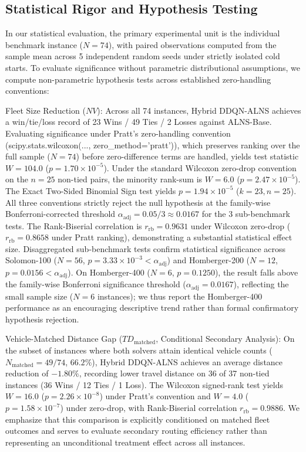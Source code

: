 \documentclass{ieeeaccess}
\begin{document}
\subsection{Statistical Rigor and Hypothesis Testing}
\label{sec:statistical_rigor}

In our statistical evaluation, the primary experimental unit is the individual benchmark instance ($N=74$), with paired observations computed from the sample mean across 5 independent random seeds under strictly isolated cold starts. To evaluate significance without parametric distributional assumptions, we compute non-parametric hypothesis tests across established zero-handling conventions:

Fleet Size Reduction ($NV$): Across all 74 instances, Hybrid DDQN-ALNS achieves a win/tie/loss record of 23 Wins / 49 Ties / 2 Losses against ALNS-Base. Evaluating significance under Pratt's zero-handling convention (\textsf{\small scipy.stats.wilcoxon(..., zero\_method='pratt')}), which preserves ranking over the full sample ($N=74$) before zero-difference terms are handled, yields test statistic $W = 104.0$ ($p = 1.70 \times 10^{-5}$). Under the standard Wilcoxon zero-drop convention on the $n=25$ non-tied pairs, the minority rank-sum is $W = 6.0$ ($p = 2.47 \times 10^{-5}$). The Exact Two-Sided Binomial Sign test yields $p = 1.94 \times 10^{-5}$ ($k=23, n=25$). All three conventions strictly reject the null hypothesis at the family-wise Bonferroni-corrected threshold $\alpha_{\text{adj}} = 0.05 / 3 \approx 0.0167$ for the 3 sub-benchmark tests. The Rank-Biserial correlation is $r_{\text{rb}} = 0.9631$ under Wilcoxon zero-drop ($r_{\text{rb}} = 0.8658$ under Pratt ranking), demonstrating a substantial statistical effect size. Disaggregated sub-benchmark tests confirm statistical significance across Solomon-100 ($N=56$, $p = 3.33 \times 10^{-3} < \alpha_{\text{adj}}$) and Homberger-200 ($N=12$, $p = 0.0156 < \alpha_{\text{adj}}$). On Homberger-400 ($N=6$, $p = 0.1250$), the result falls above the family-wise Bonferroni significance threshold ($\alpha_{\text{adj}} = 0.0167$), reflecting the small sample size ($N=6$ instances); we thus report the Homberger-400 performance as an encouraging descriptive trend rather than formal confirmatory hypothesis rejection.

Vehicle-Matched Distance Gap ($TD_{\text{matched}}$, Conditional Secondary Analysis): On the subset of instances where both solvers attain identical vehicle counts ($N_{\text{matched}} = 49 / 74$, $66.2\%$), Hybrid DDQN-ALNS achieves an average distance reduction of $-1.80\%$, recording lower travel distance on 36 of 37 non-tied instances (36 Wins / 12 Ties / 1 Loss). The Wilcoxon signed-rank test yields $W = 16.0$ ($p = 2.26 \times 10^{-8}$) under Pratt's convention and $W = 4.0$ ($p = 1.58 \times 10^{-7}$) under zero-drop, with Rank-Biserial correlation $r_{\text{rb}} = 0.9886$. We emphasize that this comparison is explicitly conditioned on matched fleet outcomes and serves to evaluate secondary routing efficiency rather than representing an unconditional treatment effect across all instances.
\end{document}
